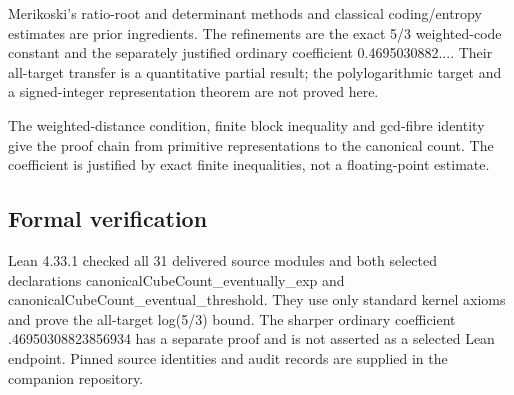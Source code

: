 \documentclass[11pt,a4paper]{article}
\begin{document}
Merikoski's ratio-root and determinant methods and classical coding/entropy estimates are prior ingredients. The refinements are the exact 5/3 weighted-code constant and the separately justified ordinary coefficient 0.4695030882.... Their all-target transfer is a quantitative partial result; the polylogarithmic target and a signed-integer representation theorem are not proved here.

The weighted-distance condition, finite block inequality and gcd-fibre identity give the proof chain from primitive representations to the canonical count. The coefficient is justified by exact finite inequalities, not a floating-point estimate.

\subsection{Formal verification}
Lean 4.33.1 checked all 31 delivered source modules and both selected declarations canonicalCubeCount\_eventually\_exp and canonicalCubeCount\_eventual\_threshold. They use only standard kernel axioms and prove the all-target log(5/3) bound. The sharper ordinary coefficient .46950308823856934 has a separate proof and is not asserted as a selected Lean endpoint. Pinned source identities and audit records are supplied in the companion repository.
\end{document}
